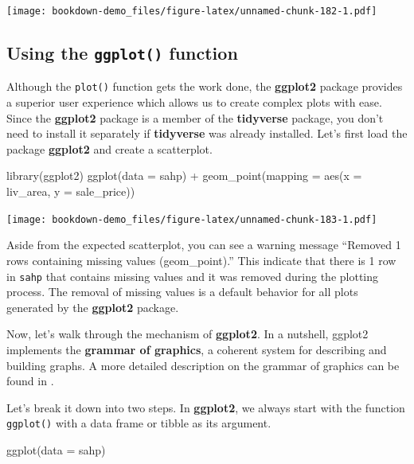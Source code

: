 \documentclass[
]{book}
\newenvironment{Shaded}{\begin{snugshade}}{\end{snugshade}}
\newcommand{\AttributeTok}[1]{\textcolor[rgb]{0.77,0.63,0.00}{#1}}
\newcommand{\FunctionTok}[1]{\textcolor[rgb]{0.00,0.00,0.00}{#1}}
\newcommand{\NormalTok}[1]{#1}
\newcommand{\SpecialCharTok}[1]{\textcolor[rgb]{0.00,0.00,0.00}{#1}}
\begin{document}
\texttt{[image: bookdown-demo\_files/figure-latex/unnamed-chunk-182-1.pdf]}

\hypertarget{using-the-ggplot-function}{%
\subsection{\texorpdfstring{Using the \texttt{ggplot()} function}{Using the ggplot() function}}\label{using-the-ggplot-function}}

Although the \texttt{plot()} function gets the work done, the \textbf{ggplot2} package provides a superior user experience which allows us to create complex plots with ease. Since the \textbf{ggplot2} package is a member of the \textbf{tidyverse} package, you don't need to install it separately if \textbf{tidyverse} was already installed. Let's first load the package \textbf{ggplot2} and create a scatterplot.

\begin{Shaded}
\begin{Highlighting}[]
\FunctionTok{library}\NormalTok{(ggplot2)}
\FunctionTok{ggplot}\NormalTok{(}\AttributeTok{data =}\NormalTok{ sahp) }\SpecialCharTok{+} \FunctionTok{geom\_point}\NormalTok{(}\AttributeTok{mapping =} \FunctionTok{aes}\NormalTok{(}\AttributeTok{x =}\NormalTok{ liv\_area, }\AttributeTok{y =}\NormalTok{ sale\_price))}
\end{Highlighting}
\end{Shaded}

\texttt{[image: bookdown-demo\_files/figure-latex/unnamed-chunk-183-1.pdf]}

Aside from the expected scatterplot, you can see a warning message ``Removed 1 rows containing missing values (geom\_point).'' This indicate that there is 1 row in \texttt{sahp} that contains missing values and it was removed during the plotting process. The removal of missing values is a default behavior for all plots generated by the \textbf{ggplot2} package.

Now, let's walk through the mechanism of \textbf{ggplot2}. In a nutshell, ggplot2 implements the \textbf{grammar of graphics}, a coherent system for describing and building graphs. A more detailed description on the grammar of graphics can be found in \citet{wickham2010layered}.

Let's break it down into two steps. In \textbf{ggplot2}, we always start with the function \texttt{ggplot()} with a data frame or tibble as its argument.

\begin{Shaded}
\begin{Highlighting}[]
\FunctionTok{ggplot}\NormalTok{(}\AttributeTok{data =}\NormalTok{ sahp)}
\end{Highlighting}
\end{Shaded}
\end{document}
